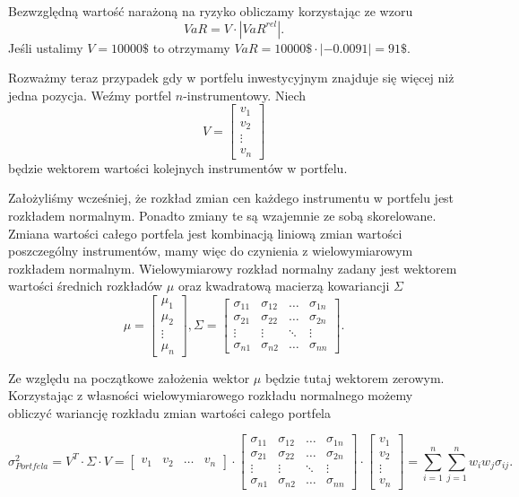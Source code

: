 \documentclass[11pt,titlepage]{article}
\numberwithin{equation}{section}
\begin{document}
Bezwzględną wartość narażoną na ryzyko obliczamy korzystając ze wzoru
$$VaR = V \cdot |VaR^{rel}|.$$
Jeśli ustalimy $V=10000\$$ to otrzymamy $VaR = 10000\$ \cdot |-0.0091| = 91\$ $.

Rozważmy teraz przypadek gdy w portfelu inwestycyjnym znajduje się więcej niż jedna pozycja. Weźmy portfel $n$-instrumentowy. Niech
$$V=\begin{bmatrix}
 v_1 \\ 
 v_2 \\
\vdots \\
v_n
\end{bmatrix}$$
będzie wektorem wartości kolejnych instrumentów w portfelu.

Założyliśmy wcześniej, że rozkład zmian cen każdego instrumentu w portfelu jest rozkładem normalnym. Ponadto zmiany te są wzajemnie ze sobą skorelowane. Zmiana wartości całego portfela jest kombinacją liniową zmian wartości poszczególny instrumentów, mamy więc do czynienia z wielowymiarowym rozkładem normalnym. Wielowymiarowy rozkład normalny zadany jest wektorem wartości średnich rozkładów $\mu$ oraz kwadratową macierzą kowariancji $\Sigma$
$$\mu=\begin{bmatrix}
 \mu_1 \\ 
 \mu_2 \\
\vdots \\
\mu_n
\end{bmatrix},\Sigma=\begin{bmatrix}
\sigma_{11} & \sigma_{12} & \hdots & \sigma_{1n} \\ 
\sigma_{21} & \sigma_{22} & \hdots & \sigma_{2n} \\
\vdots & \vdots & \ddots & \vdots\\
\sigma_{n1} & \sigma_{n2} & \hdots & \sigma_{nn}
\end{bmatrix}. $$

Ze względu na początkowe założenia wektor $\mu$ będzie tutaj wektorem zerowym. Korzystając z własności wielowymiarowego rozkładu normalnego możemy obliczyć wariancję rozkładu zmian wartości całego portfela 


$$ \sigma_{Portfela}^2 = V^T  \cdot \Sigma \cdot V =  \begin{bmatrix}
 v_1 & v_2 & \hdots & v_n
\end{bmatrix} 
\cdot
\begin{bmatrix}
\sigma_{11} & \sigma_{12} & \hdots & \sigma_{1n} \\ 
\sigma_{21} & \sigma_{22} & \hdots & \sigma_{2n} \\
\vdots & \vdots & \ddots & \vdots\\
\sigma_{n1} & \sigma_{n2} & \hdots & \sigma_{nn}
\end{bmatrix}  
\cdot
\begin{bmatrix}
 v_1 \\ 
 v_2 \\
\vdots \\
v_n
\end{bmatrix}
=\sum_{i=1}^{n}\sum_{j=1}^{n}w_i w_j \sigma_{ij}.
$$
\end{document}
